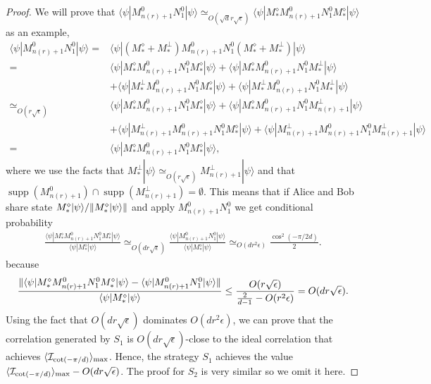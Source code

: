 \documentclass[11pt,letterpaper]{article}
\newcommand{\ket}[1]{|#1\rangle}
\newcommand{\bra}[1]{\langle#1|}
\DeclarePairedDelimiter{\norm}{\lVert}{\rVert}
\DeclarePairedDelimiter{\ip}{\langle}{\rangle}
\DeclareMathOperator{\supp}{supp}
\newcommand{\1}{\mathbb{1}}
\newcommand{\nr}{n(r)}
\newcommand{\I}{\mathcal{I}}
\newcommand{\ep}{\epsilon}
\newcommand{\se}{\sqrt{\epsilon}}
\newcommand{\sd}{\sqrt{d}}
\newcommand{\appd}[1]{\simeq_{#1}}
\theoremstyle{definition}
\begin{document}
\begin{proof}
We will prove that $\bra{\psi} M_{\nr+1}^0N_1^0 \ket{\psi} \appd{O(\sd r\se)} \bra{\psi}M_\ast^\diamond M_{\nr+1}^0N_1^0 M_\ast^\diamond\ket{\psi}$ as an example,
\begin{align*}
	   \bra{\psi} M_{\nr+1}^0N_1^0 \ket{\psi} 
	= &\bra{\psi}(M_\ast^\diamond + M_\ast^\perp) M_{\nr+1}^0N_1^0 (M_\ast^\diamond + M_\ast^\perp)\ket{\psi} \\
	= & \bra{\psi}M_\ast^\diamond M_{\nr+1}^0N_1^0 M_\ast^\diamond\ket{\psi} + \bra{\psi}M_\ast^\diamond M_{\nr+1}^0N_1^0 M_\ast^\perp\ket{\psi}\\
	&+\bra{\psi}M_\ast^\perp M_{\nr+1}^0N_1^0 M_\ast^\diamond\ket{\psi} + \bra{\psi}M_\ast^\perp M_{\nr+1}^0N_1^0 M_\ast^\perp\ket{\psi}\\
	\appd{O(r\se)}&  \bra{\psi}M_\ast^\diamond M_{\nr+1}^0N_1^0 M_\ast^\diamond\ket{\psi} + \bra{\psi}M_\ast^\diamond M_{\nr+1}^0N_1^0 M_{\nr+1}^\perp\ket{\psi} \\
	&+\bra{\psi}M_{\nr+1}^\perp M_{\nr+1}^0N_1^0 M_\ast^\diamond\ket{\psi} + \bra{\psi}M_{\nr+1}^\perp M_{\nr+1}^0N_1^0 M_{\nr+1}^\perp\ket{\psi}\\
	=&\bra{\psi}M_\ast^\diamond M_{\nr+1}^0N_1^0 M_\ast^\diamond\ket{\psi},
\end{align*}
where we use the facts that $M_\ast^\perp \ket{\psi} \appd{O(r\se)} M_{\nr+1}^\perp \ket{\psi}$ and that 
$\supp(M_{\nr+1}^0) \cap \supp(M_{\nr+1}^\perp) = \emptyset$. This means that if Alice and Bob share state $M_\ast^\diamond \ket{\psi}/\norm{M_\ast^\diamond \ket{\psi}}$ and apply $M_{\nr+1}^0N_1^0$
we get conditional probability
\begin{align*}
	\frac{\bra{\psi}M_\ast^\diamond M_{\nr+1}^0N_1^0 M_\ast^\diamond\ket{\psi}}{\bra{\psi} M_\ast^\diamond \ket{\psi}}  
	\appd{O(d r\se)} \frac{\bra{\psi} M_{\nr+1}^0N_1^0 \ket{\psi}}{\bra{\psi} M_\ast^\diamond \ket{\psi}}
	\appd{O(d r^2 \ep)}
	\frac{\cos^2(-\pi/2d)}{2}.
\end{align*} 
because
\begin{align*}
	\frac{ \norm{\bra{\psi}M_\ast^\diamond M_{\nr+1}^0N_1^0 M_\ast^\diamond\ket{\psi} -  \bra{\psi} M_{\nr+1}^0N_1^0 \ket{\psi}}}
	{\bra{\psi} M_\ast^\diamond \ket{\psi}} \leq \frac{O(r\se)}{\frac{2}{d-1} - O(r^2 \ep)} = O(d r  \se).
\end{align*}
Using the fact that $O(d r \se)$ dominates $O(dr^2 \ep)$,
we can prove that the correlation generated by $S_1$ 
is $O(dr\se)$-close to the ideal correlation that achieves $\ip{\I_{\cot(-\pi/d)}}_{\max}$.
Hence, the strategy $S_1$ achieves the value $\ip{\I_{\cot(-\pi/d)}}_{\max} - O(d r \se)$.
The proof for $S_2$ is very similar so we omit it here.
\end{proof}
\end{document}
